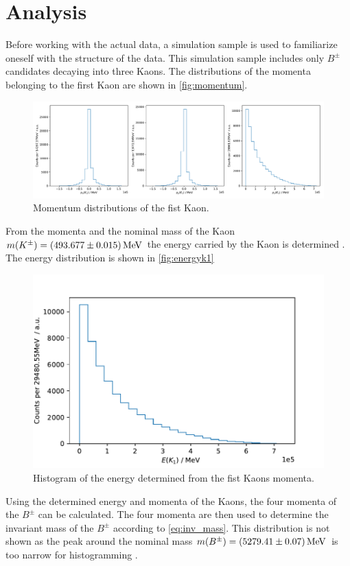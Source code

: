 \section{Analysis}  %
\label{sec:Analysis}

Before working with the actual data, 
a simulation sample is used to familiarize oneself with the structure of the data. 
This simulation sample includes only $B^\pm$ candidates decaying into three Kaons. 
The distributions of the momenta belonging to the first Kaon are shown in \autoref{fig:momentum}. 

\begin{figure}
	\centering
	\includegraphics[width=0.9\linewidth]{content/pictures/image_fin/momentum}
	\caption{Momentum distributions of the fist Kaon.}
	\label{fig:momentum}
\end{figure}


From the momenta and the nominal mass of the Kaon $m(K^\pm) = \qty{493.677 \pm 0.015}{\mega\eV }$ 
the energy carried by the Kaon is determined \cite{pdg}. 
The energy distribution is shown in \autoref{fig:energyk1}

\begin{figure}
	\centering
	\includegraphics[width=0.6\linewidth]{content/pictures/image_fin/energyK1}
	\caption{Histogram of the energy determined from the fist Kaons momenta.}
	\label{fig:energyk1}
\end{figure}


Using the determined energy and momenta of the Kaons, the four 
momenta of the $B^\pm$ can be calculated. The four momenta are then 
used to determine the invariant mass of the $B^\pm$ according to \eqref{eq:inv_mass}. 
This distribution is not shown as the peak around the nominal mass 
$m(B^\pm) = \qty{5279.41\pm0.07}{\mega\eV}$ is 
too narrow for histogramming \cite{pdg}. \\


